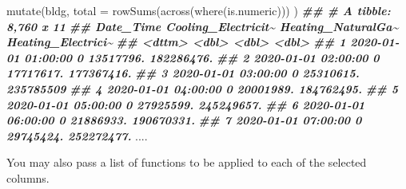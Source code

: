 \documentclass[
]{book}
\newenvironment{Shaded}{\begin{snugshade}}{\end{snugshade}}
\newcommand{\AttributeTok}[1]{\textcolor[rgb]{0.77,0.63,0.00}{#1}}
\newcommand{\DocumentationTok}[1]{\textcolor[rgb]{0.56,0.35,0.01}{\textbf{\textit{#1}}}}
\newcommand{\FunctionTok}[1]{\textcolor[rgb]{0.00,0.00,0.00}{#1}}
\newcommand{\NormalTok}[1]{#1}
\begin{document}
\begin{Shaded}
\begin{Highlighting}[]

\FunctionTok{mutate}\NormalTok{(bldg,}
  \AttributeTok{total =} \FunctionTok{rowSums}\NormalTok{(}\FunctionTok{across}\NormalTok{(}\FunctionTok{where}\NormalTok{(is.numeric)))}
\NormalTok{)}
\DocumentationTok{\#\# \# A tibble: 8,760 x 11}
\DocumentationTok{\#\#    Date\_Time           Cooling\_Electricit\textasciitilde{} Heating\_NaturalGa\textasciitilde{} Heating\_Electrici\textasciitilde{}}
\DocumentationTok{\#\#    \textless{}dttm\textgreater{}                            \textless{}dbl\textgreater{}              \textless{}dbl\textgreater{}              \textless{}dbl\textgreater{}}
\DocumentationTok{\#\#  1 2020{-}01{-}01 01:00:00                   0          13517796.         182286476.}
\DocumentationTok{\#\#  2 2020{-}01{-}01 02:00:00                   0          17717617.         177367416.}
\DocumentationTok{\#\#  3 2020{-}01{-}01 03:00:00                   0          25310615.         235785509 }
\DocumentationTok{\#\#  4 2020{-}01{-}01 04:00:00                   0          20001989.         184762495.}
\DocumentationTok{\#\#  5 2020{-}01{-}01 05:00:00                   0          27925599.         245249657.}
\DocumentationTok{\#\#  6 2020{-}01{-}01 06:00:00                   0          21886933.         190670331.}
\DocumentationTok{\#\#  7 2020{-}01{-}01 07:00:00                   0          29745424.         252272477.}
\NormalTok{....}
\end{Highlighting}
\end{Shaded}

You may also pass a list of functions to be applied to each of the selected columns.
\end{document}
